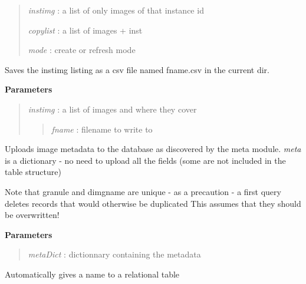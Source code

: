 \documentclass[letterpaper,10pt,english]{sphinxmanual}
\begin{document}
\begin{fulllineitems}
\begin{fulllineitems}
\begin{quote}
\emph{instimg}    : a list of only images of that instance id

\emph{copylist}   : a list of images + inst

\emph{mode}       : create or refresh mode
\end{quote}

\end{fulllineitems}


\begin{fulllineitems}
\label{code:Database.Database.instimgExport}
Saves the instimg listing as a csv file named fname.csv in the current dir.

\textbf{Parameters}
\begin{quote}

\emph{instimg} : a list of images and where they cover
\begin{quote}

\emph{fname}   : filename to write to
\end{quote}
\end{quote}

\end{fulllineitems}


\begin{fulllineitems}
\label{code:Database.Database.meta2db}
Uploads image metadata to the database as discovered by the meta module.
\emph{meta} is a dictionary - no need to upload all the fields (some are not
included in the table structure)

Note that granule and dimgname are unique - as a precaution - a first query
deletes records that would otherwise be duplicated 
This assumes that they should be overwritten!

\textbf{Parameters}
\begin{quote}

\emph{metaDict} : dictionnary containing the metadata
\end{quote}

\end{fulllineitems}


\begin{fulllineitems}
\label{code:Database.Database.nameTable}
Automatically gives a name to a relational table


\end{fulllineitems}
\end{fulllineitems}
\end{document}
